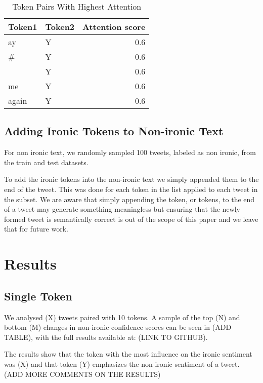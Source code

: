 \documentclass[10pt, a4paper]{article}
\begin{document}
\begin{table*}
\caption{Token Pairs With Highest Attention}
\label{tab:attention-tokens-pairs}
\begin{center}
\begin{tabular}{llr}
\toprule
Token1 & Token2 & Attention score\\
\midrule
ay                  & Y & 0.6 \\
\#                  & Y & 0.6 \\
\textvisiblespace   & Y & 0.6 \\
me                  & Y & 0.6 \\
again               & Y & 0.6 \\
\bottomrule
\end{tabular}
\end{center}
\end{table*}

\subsection{Adding Ironic Tokens to Non-ironic Text}

For non ironic text, we randomly sampled 100 tweets, labeled as non ironic, from the train and test datasets.

To add the ironic tokens into the non-ironic text we simply appended them to the end of the tweet. This was done for each token in the list applied to each tweet in the subset.
We are aware that simply appending the token, or tokens, to the end of a tweet may generate something meaningless but ensuring that the newly formed tweet is semantically correct is out of the scope of this paper and we leave that for future work.

\section{Results}

\subsection{Single Token}

We analysed (X) tweets paired with 10 tokens. A sample of the top (N) and bottom (M) changes in non-ironic confidence scores can be seen in (ADD TABLE), with the full results available at: (LINK TO GITHUB).

The results show that the token with the most influence on the ironic sentiment was (X) and that token (Y) emphasizes the non ironic sentiment of a tweet. (ADD MORE COMMENTS ON THE RESULTS)
\end{document}
